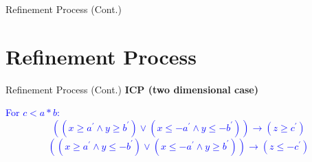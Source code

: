 \documentclass[]{beamer}
\begin{document}
\begin{frame}{Refinement Process (Cont.)}
\begin{overlayarea}{12cm}{5.5cm}
    	\begin{minipage}{5cm}
    		\vspace{1cm}
    		\begin{figure}	
    		\end{figure}
    		\centering
    		\vspace{-0.5cm}
    	\end{minipage}
    \end{overlayarea}
\end{frame}

\section{Refinement Process}
\begin{frame}{Refinement Process (Cont.)}
    \textbf{ICP (two dimensional case)}\newline
    
    \textcolor<1>{blue}{For $c < a \ast b$:
        $$((x \geq a^\prime \wedge y \geq b^\prime) \vee (x \leq -a^\prime \wedge y \leq -b^\prime)) \rightarrow (z \geq c^\prime)$$
        $$((x \geq a^\prime \wedge y \leq -b^\prime) \vee (x \leq -a^\prime \wedge y \geq b^\prime)) \rightarrow (z \leq -c^\prime)$$}\newline
        
\end{frame}
\end{document}
